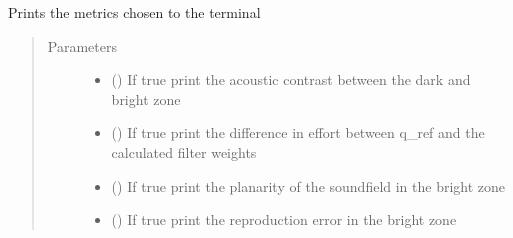 \documentclass[letterpaper,10pt,english]{sphinxmanual}
\begin{document}
\begin{fulllineitems}
\begin{fulllineitems}
\begin{quote}
\begin{description}
\begin{itemize}
\end{itemize}

\end{description}\end{quote}

\end{fulllineitems}


\begin{fulllineitems}
\label{\detokenize{source/pyzones:pyzones.Metrics.print}}
Prints the metrics chosen to the terminal
\begin{quote}\begin{description}
\item[{Parameters}] \leavevmode\begin{itemize}
\item {} 
 () \textendash{} If true print the acoustic contrast between the dark and bright zone

\item {} 
 () \textendash{} If true print the difference in effort between q\_ref and the calculated filter weights

\item {} 
 () \textendash{} If true print the planarity of the soundfield in the bright zone

\item {} 
 () \textendash{} If true print the reproduction error in the bright zone

\end{itemize}

\end{description}\end{quote}

\end{fulllineitems}


\end{fulllineitems}
\end{document}

